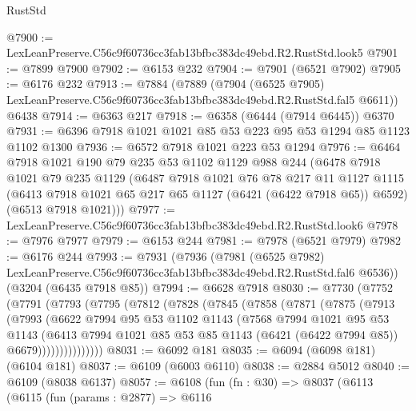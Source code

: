 \begin{lexlean}{RustStd}
\begin{coremodule}
@7900 := LexLeanPreserve.C56c9f60736cc3fab13bfbc383dc49ebd.R2.RustStd.look5
@7901 := @7899 @7900
@7902 := @6153 @232
@7904 := @7901 (@6521 @7902)
@7905 := @6176 @232
@7913 := @7884
    (@7889
      (@7904 (@6525 @7905) LexLeanPreserve.C56c9f60736cc3fab13bfbc383dc49ebd.R2.RustStd.fal5 @6611))
    @6438
@7914 := @6363 @217
@7918 := @6358 (@6444 (@7914 @6445)) @6370
@7931 := @6396 @7918 @1021 @1021 @85 @53 @223 @95 @53 @1294 @85 @1123 @1102 @1300
@7936 := @6572 @7918 @1021 @223 @53 @1294
@7976 := @6464
    @7918
    @1021
    @190
    @79
    @235
    @53
    @1102
    @1129
    @988
    @244
    (@6478
      @7918
      @1021
      @79
      @235
      @1129
      (@6487
        @7918
        @1021
        @76
        @78
        @217
        @11
        @1127
        @1115
        (@6413 @7918 @1021 @65 @217 @65 @1127 (@6421 (@6422 @7918 @65)) @6592)
        (@6513 @7918 @1021)))
@7977 := LexLeanPreserve.C56c9f60736cc3fab13bfbc383dc49ebd.R2.RustStd.look6
@7978 := @7976 @7977
@7979 := @6153 @244
@7981 := @7978 (@6521 @7979)
@7982 := @6176 @244
@7993 := @7931
    (@7936
      (@7981 (@6525 @7982) LexLeanPreserve.C56c9f60736cc3fab13bfbc383dc49ebd.R2.RustStd.fal6 @6536))
    (@3204 (@6435 @7918 @85))
@7994 := @6628 @7918
@8030 := @7730
    (@7752
      (@7791
        (@7793
          (@7795
            (@7812
              (@7828
                (@7845
                  (@7858
                    (@7871
                      (@7875
                        (@7913
                          (@7993
                            (@6622
                              @7994
                              @95
                              @53
                              @1102
                              @1143
                              (@7568
                                @7994
                                @1021
                                @95
                                @53
                                @1143
                                (@6413
                                  @7994
                                  @1021
                                  @85
                                  @53
                                  @85
                                  @1143
                                  (@6421 (@6422 @7994 @85))
                                  @6679)))))))))))))))
@8031 := @6092 @181
@8035 := @6094 (@6098 @181) (@6104 @181)
@8037 := @6109 (@6003 @6110)
@8038 := @2884 @5012
@8040 := @6109 (@8038 @6137)
@8057 := @6108
    (fun (fn : @30) =>
    @8037
      (@6113
        (@6115
          (fun (params : @2877) =>
          @6116

\end{coremodule}
\end{lexlean}
